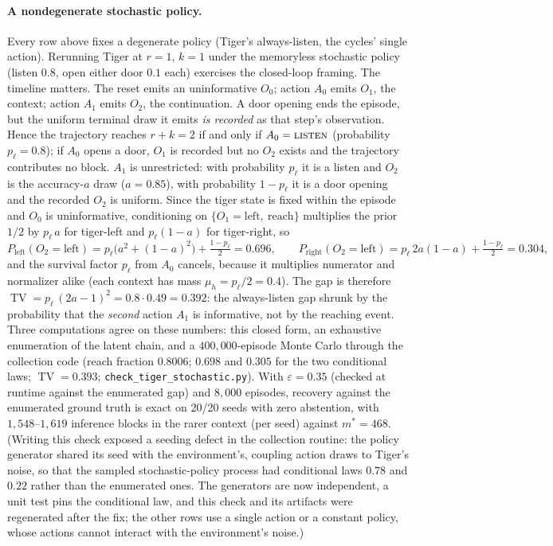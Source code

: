 \documentclass{article}
\newcommand{\eps}{\varepsilon}
\DeclareMathOperator{\TV}{TV}
\begin{document}
\paragraph{A nondegenerate stochastic policy.}
Every row above fixes a degenerate policy (Tiger's always-listen, the
cycles' single action).  Rerunning Tiger at $r=1$, $k=1$ under the
memoryless stochastic policy (listen $0.8$, open either door $0.1$ each)
exercises the closed-loop framing.  The timeline matters.  The reset emits
an uninformative $O_0$; action $A_0$ emits $O_1$, the context; action
$A_1$ emits $O_2$, the continuation.  A door opening ends the episode, but
the uniform terminal draw it emits \emph{is recorded} as that step's
observation.  Hence the trajectory reaches $r+k=2$ if and only if
$A_0=\textsc{listen}$ (probability $p_\ell=0.8$); if $A_0$ opens a door,
$O_1$ is recorded but no $O_2$ exists and the trajectory contributes no
block.  $A_1$ is unrestricted: with probability $p_\ell$ it is a listen
and $O_2$ is the accuracy-$a$ draw ($a=0.85$), with probability $1-p_\ell$
it is a door opening and the recorded $O_2$ is uniform.  Since the tiger
state is fixed within the episode and $O_0$ is uninformative, conditioning
on $\{O_1=\text{left},\ \text{reach}\}$ multiplies the prior $1/2$ by
$p_\ell\,a$ for tiger-left and $p_\ell(1-a)$ for tiger-right, so
\[
  P_{\text{left}}(O_2{=}\text{left})
  = p_\ell\bigl(a^2+(1-a)^2\bigr)+\tfrac{1-p_\ell}{2}=0.696,\qquad
  P_{\text{right}}(O_2{=}\text{left})
  = p_\ell\,2a(1-a)+\tfrac{1-p_\ell}{2}=0.304 ,
\]
and the survival factor $p_\ell$ from $A_0$ cancels, because it multiplies
numerator and normalizer alike (each context has mass $\mu_h=p_\ell/2=0.4$).
The gap is therefore $\TV=p_\ell\,(2a-1)^2=0.8\cdot0.49=0.392$: the
always-listen gap shrunk by the probability that the \emph{second} action
$A_1$ is informative, not by the reaching event.  Three computations agree
on these numbers: this closed form, an exhaustive enumeration of the latent
chain, and a $400{,}000$-episode Monte Carlo through the collection
code (reach fraction $0.8006$; $0.698$ and $0.305$ for the two
conditional laws; $\TV=0.393$; \texttt{check\_tiger\_stochastic.py}).
With $\eps=0.35$ (checked at runtime against the enumerated gap) and
$8{,}000$ episodes, recovery against the enumerated ground truth is exact
on 20/20 seeds with zero abstention, with $1{,}548$--$1{,}619$ inference
blocks in the rarer context (per seed) against $m^*=468$.  (Writing this check exposed a
seeding defect in the collection routine: the policy generator shared its
seed with the environment's, coupling action draws to Tiger's noise, so
that the sampled stochastic-policy process had conditional laws $0.78$ and
$0.22$ rather than the enumerated ones.  The generators are now independent,
a unit test pins the conditional law, and this check and its artifacts were
regenerated after the fix; the other rows use a single action or a constant
policy, whose actions cannot interact with the environment's noise.)
\end{document}

